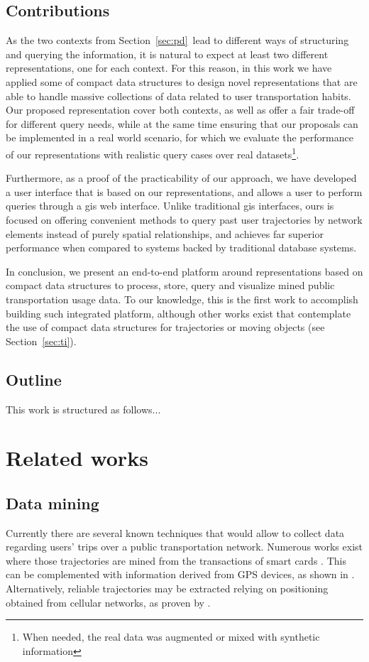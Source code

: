 \documentclass[a4paper,10pt,twoside]{book}
\begin{document}
	\section{Contributions}
	As the two contexts from Section~\ref{sec:pd}~lead to different ways of structuring and querying the information, it is natural to expect at least two different representations, one for each context. For this reason, in this work we have applied some of compact data structures to design novel representations that are able to handle massive collections of data related to user transportation habits. Our proposed representation cover both contexts, as well as offer a fair trade-off for different query needs, while at the same time ensuring that our proposals can be implemented in a real world scenario, for which we evaluate the performance of our representations with realistic query cases over real datasets\footnote{When needed, the real data was augmented or mixed with synthetic information}.
	
	Furthermore, as a proof of the practicability of our approach, we have developed a user interface that is based on our representations, and allows a user to perform queries through a \gls{gis} web interface. Unlike traditional \gls{gis} interfaces, ours is focused on offering convenient methods to query past user trajectories by network elements instead of purely spatial relationships, and achieves far superior performance when compared to systems backed by traditional database systems.
	
	In conclusion, we present an end-to-end platform around representations based on compact data structures to process, store, query and visualize mined public transportation usage data. To our knowledge, this is the first work to accomplish building such integrated platform, although other works exist that contemplate the use of compact data structures for trajectories or moving objects (see Section~\ref{sec:ti}).
	
	\section{Outline}
	This work is structured as follows...
	
\chapter{Related works}
	\section{Data mining}
	\label{sec:dm}
	Currently there are several known techniques that would allow to collect data regarding users' trips over a public transportation network. Numerous works exist where those trajectories are mined from the transactions of smart cards \cite{bhaskar2015passenger,wang2014aggregated}. This can be complemented with information derived from GPS devices, as shown in \cite{ma2014development}. Alternatively, reliable trajectories may be extracted relying on positioning obtained from cellular networks, as proven by \cite{liu2017exploring}.
	
\end{document}
